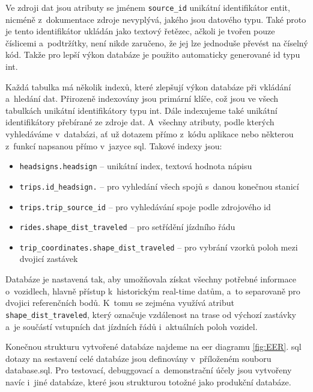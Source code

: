 Ve zdroji dat jsou atributy se jménem \verb-source_id- unikátní identifikátor entit, nicméně z~dokumentace zdroje nevyplývá, jakého jsou datového typu. Také proto je tento identifikátor ukládán jako textový řetězec, ačkoli je tvořen pouze číslicemi a~podtržítky, není nikde zaručeno, že jej lze jednoduše převést na číselný kód. Takže pro lepší výkon databáze je použito automaticky generované id typu \gls{int}.

\bigbreak

Každá tabulka má několik indexů, které zlepšují výkon databáze při vkládání a~hledání dat. Přirozeně indexovány jsou primární klíče, což jsou ve všech tabulkách unikátní identifikátory typu \gls{int}. Dále indexujeme také unikátní identifikátory přebírané ze zdroje dat. A~všechny atributy, podle kterých vyhledáváme v~databázi, ať už dotazem přímo z~kódu aplikace nebo některou z~funkcí napsanou přímo v~jazyce \gls{sql}. Takové indexy jsou:


\begin{itemize}


\item \verb-headsigns.headsign- -- unikátní index, textová hodnota nápisu


\item \verb-trips.id_headsign.- -- pro vyhledání všech spojů s~danou konečnou stanicí


\item \verb-trips.trip_source_id- -- pro vyhledávání spoje podle zdrojového id


\item \verb-rides.shape_dist_traveled- -- pro setřídění jízdního řádu

\item \verb-trip_coordinates.shape_dist_traveled- -- pro vybrání vzorků poloh me\-zi dvojicí zastávek


\end{itemize}


\bigbreak

Databáze je nastavená tak, aby umožňovala získat všechny potřebné informace o~vozidlech, hlavně přístup k~historickým real-time datům, a~to separovaně pro dvojici referenčních bodů. K~tomu se zejména využívá atribut \texttt{shape\_dist\allowbreak\_traveled}, který označuje vzdálenost na trase od výchozí zastávky a~je součástí vstupních dat jízdních řádů i~aktuálních poloh vozidel.

\bigbreak

Konečnou strukturu vytvořené databáze najdeme na \gls{eer} diagramu \ref{fig:EER}. \gls{sql} dotazy na sestavení celé databáze jsou definovány v~příloženém souboru database.sql. Pro testovací, debuggovací a~demonstrační účely jsou vytvořeny navíc i~jiné databáze, které jsou strukturou totožné jako produkční databáze.

